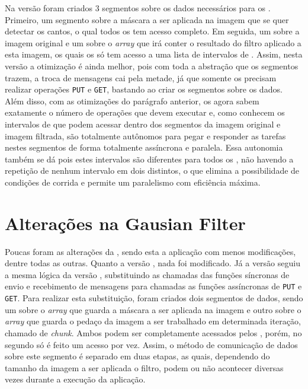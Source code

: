 Na versão \ASYNC foram criados 3 segmentos sobre os dados necessários para os \slaves. Primeiro, um segmento sobre a máscara a ser aplicada na imagem que se quer detectar os cantos, o qual todos os \CCs tem acesso completo. Em seguida, um sobre a imagem original e um sobre o \textit{array} que irá conter o resultado do filtro aplicado a esta imagem, os quais os \CCs só tem acesso a uma lista de intervalos de \offsets. Assim, nesta versão a otimização é ainda melhor, pois com toda a abstração que os segmentos trazem, a troca de mensagens cai pela metade, já que somente os \slaves precisam realizar operações \texttt{PUT} e \texttt{GET}, bastando ao \master criar os segmentos sobre os dados. Além disso, com as otimizações do parágrafo anterior, os \slaves agora sabem exatamente o número de operações que devem executar e, como conhecem os intervalos de \offsets que podem acessar dentro dos segmentos da imagem original e imagem filtrada, são totalmente autônomos para pegar e responder as tarefas nestes segmentos de forma totalmente assíncrona e paralela. Essa autonomia também se dá pois estes intervalos são diferentes para todos os \slaves, não havendo a repetição de nenhum intervalo em dois \CCs distintos, o que elimina a possibilidade de condições de corrida e permite um paralelismo com eficiência máxima.

\section{Alterações na Gausian Filter}
\label{sec:alteracoesgf}

Poucas foram as alterações da \GF, sendo esta a aplicação com menos modificações, dentre todas as outras. Quanto a versão \IPC, nada foi modificado. Já a versão \ASYNC seguiu a mesma lógica da versão \IPC, substituindo as chamadas das funções síncronas de envio e recebimento de mensagens para chamadas as funções assíncronas de \texttt{PUT} e \texttt{GET}. Para realizar esta substituição, foram criados dois segmentos de dados, sendo um sobre o \textit{array} que guarda a máscara a ser aplicada na imagem e outro sobre o \textit{array} que guarda o pedaço da imagem a ser trabalhado em determinada iteração, chamado de \textit{chunk}. Ambos podem ser completamente acessados pelos \slaves, porém, no segundo só é feito um acesso por vez. Assim, o método de comunicação de dados sobre este segmento é separado em duas etapas, as quais, dependendo do tamanho da imagem a ser aplicada o filtro, podem ou não acontecer diversas vezes durante a execução da aplicação. 

